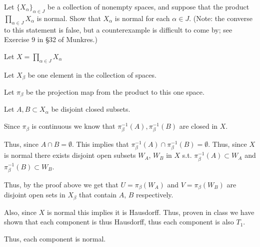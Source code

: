 \documentclass[12pt, letterpaper]{article}
\begin{document}
\begin{problem}{}
    Let $\{X_\alpha\}_{\alpha \in J}$ be a collection of nonempty
spaces, and suppose that the product $\prod_{\alpha \in J}X_\alpha$
is normal. Show that $X_\alpha$ is normal for each $\alpha \in
J$. (Note: the converse to this statement is false, but a
counterexample is difficult to come by; see Exercise 9 in \S 32 of
Munkres.)
\end{problem}
\begin{problemproof}
    Let $X = \prod_{\alpha \in J} X_\alpha$

    Let $X_\beta$ be one element in the collection of spaces.

    Let $\pi_\beta$ be the projection map from the product to this one space.

    Let $A,B \subset X_\alpha$ be disjoint closed subsets.

    Since $\pi_\beta$ is continuous we know that $\pi^{-1}_\beta(A),\pi^{-1}_\beta(B)$ are closed in $X$.

    Thus, since $A \cap B = \emptyset$. This implies that $\pi^{-1}_\beta(A) \cap \pi^{-1}_\beta(B) = \emptyset$. Thus, since $X$ is normal there exists disjoint open subsets $W_A$, $W_B$ in $X$ s.t. $\pi^{-1}_\beta(A) \subset W_A$ and $\pi^{-1}_\beta(B) \subset W_B$.

    Thus, by the proof above we get that $U=\pi_\beta(W_A)$ and $V=\pi_\beta(W_B)$ are disjoint open sets in $X_\beta$ that contain $A$, $B$ respectively.

    Also, since $X$ is normal this implies it is Hausdorff. Thus, proven in class we have shown that each component is thus Hausdorff, thus each component is also $T_1$.
    
    Thus, each component is normal.
\end{problemproof}
\end{document}
